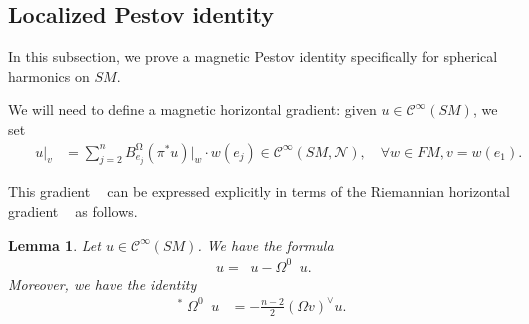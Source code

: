 \documentclass[12pt]{amsart}
\numberwithin{numbering}{section}
\theoremstyle{plain}
\newtheorem{lem}[numbering]{Lemma}
\theoremstyle{definition}
\theoremstyle{remark}
\numberwithin{equation}{section}
\DeclareMathOperator{\nv}{\nabla_{\mathbb{V}}}
\DeclareMathOperator{\nh}{\nabla_{\mathbb{H}}}
\DeclareMathOperator{\nhs}{\nabla_{\mathbb{H}^{\mg}}}
\DeclareMathOperator{\mg}{\Omega}
\begin{document}
\subsection{Localized Pestov identity} \label{sec:loc_mag_pestov}

In this subsection, we prove a magnetic Pestov identity specifically for spherical harmonics on $SM$. 

\medskip

We will need to define a magnetic horizontal gradient: given $u \in \mathcal{C}^\infty(SM)$, we set
\begin{align} 
\quad \nhs u \vert_v &= \sum_{j=2}^n B^{\mg}_{e_j} (\pi^* u) \vert_w \cdot w(e_j) \in \mathcal{C}^\infty(SM, \mathcal{N}), \quad \forall w \in FM, v = w(e_1).
\end{align} 

This gradient $\nhs$ can be expressed explicitly in terms of the Riemannian horizontal gradient $\nh$ as follows.
\begin{lem} \label{lem:mag_hor_grad}
Let $u \in \mathcal{C}^\infty(SM)$. We have the formula 
\begin{align*}
\nhs u = \nh u - \Omega^0 \nv u.
\end{align*}
Moreover, we have the identity 
\begin{align*}
\nv^* \Omega^0 \nv u &= - \frac{n-2}{2} (\Omega v)^\vee u.
\end{align*}
\end{lem}
\end{document}
